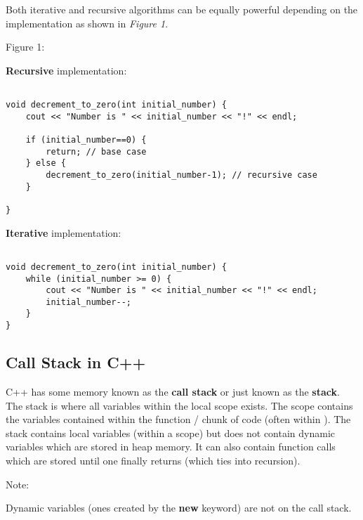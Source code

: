 \documentclass[11pt,a4paper,english]{paper}
\begin{document}
\bigskip

Both iterative and recursive algorithms can be equally powerful depending on the implementation as shown in \textit{Figure 1}.
\bigskip

\begin{bbox}{Figure 1:} {


    \textbf{Recursive} implementation:
  \begin{verbatim}

void decrement_to_zero(int initial_number) {
    cout << "Number is " << initial_number << "!" << endl;

    if (initial_number==0) {
        return; // base case
    } else {
        decrement_to_zero(initial_number-1); // recursive case
    }

}

\end{verbatim}

\bigskip
    \textbf{Iterative} implementation:

\begin{verbatim}

void decrement_to_zero(int initial_number) {
    while (initial_number >= 0) {
        cout << "Number is " << initial_number << "!" << endl;
        initial_number--;
    }
}

\end{verbatim}

}\end{bbox}

\subsection{Call Stack in C++}

C++ has some memory known as the \textbf{call stack} or just known as the \textbf{stack}. The stack is where all variables within the local scope exists. The scope contains the variables contained within the function / chunk of code (often within {}). The stack contains local variables (within a scope) but does not contain dynamic variables which are stored in heap memory. It can also contain function calls which are stored until one finally returns (which ties into recursion).

\bigskip 
\begin{mybox}{Note:} {

  Dynamic variables (ones created by the \textbf{new} keyword) are not on the call stack.

}\end{mybox}
\end{document}
